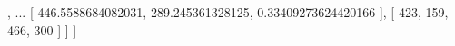 \startJSON
[
	[
		[
			429.6509704589844,
			170.8621368408203,
			0.9522638320922852
		],
		...
		[
			446.5588684082031,
			289.245361328125,
			0.33409273624420166
		],
		[
			423,
			159,
			466,
			300
		]
	]
]
\stopJSON
\stopbuffer